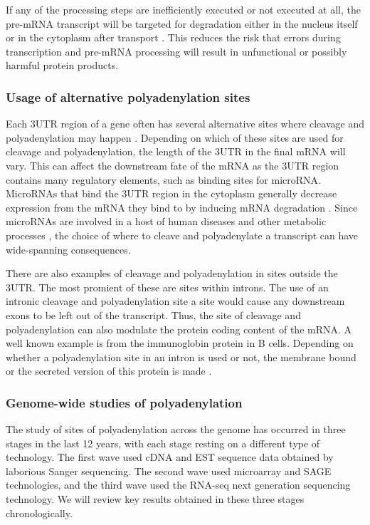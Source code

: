 If any of the processing steps are inefficiently executed or not executed at
all, the pre-mRNA transcript will be targeted for degradation either in the
nucleus itself or in the cytoplasm after transport \cite{doma_rna_2007}. This
reduces the risk that errors during transcription and pre-mRNA processing will
result in unfunctional or possibly harmful protein products.

\subsubsection{Usage of alternative polyadenylation sites}
Each 3\p UTR region of a gene often has several alternative sites where
cleavage and polyadenylation may happen \cite{tian_large-scale_2005}. Depending
on which of these sites are used for cleavage and polyadenylation, the length
of the 3\p UTR in the final mRNA will vary. This can affect the downstream fate
of the mRNA as the 3\p UTR region contains many regulatory elements, such as
binding sites for microRNA. MicroRNAs that bind the 3\p UTR region in the
cytoplasm generally decrease expression from the mRNA they bind to by inducing
mRNA degradation \cite{huntzinger_gene_2011}. Since microRNAs are involved in a
host of human diseases and other metabolic processes
\cite{huang_biological_2010}, the choice of where to cleave and polyadenylate a
transcript can have wide-spanning consequences.

There are also examples of cleavage and polyadenylation in sites outside the
3\p UTR. The most promient of these are sites within introns. The use of an
intronic cleavage and polyadenylation site a site would cause any downstream
exons to be left out of the transcript. Thus, the site of cleavage and
polyadenylation can also modulate the protein coding content of the mRNA. A
well known example is from the immunoglobin protein in B cells. Depending on
whether a polyadenylation site in an intron is used or not, the membrane bound
or the secreted version of this protein is made \cite{peterson_regulated_1989}.

\subsubsection{Genome-wide studies of polyadenylation}
The study of sites of polyadenylation across the genome has occurred in three
stages in the last 12 years, with each stage resting on a different type of
technology. The first wave used cDNA and EST sequence data obtained by
laborious Sanger sequencing. The second wave used microarray and SAGE
technologies, and the third wave used the RNA-seq next generation sequencing
technology. We will review key results obtained in these three stages
chronologically.


